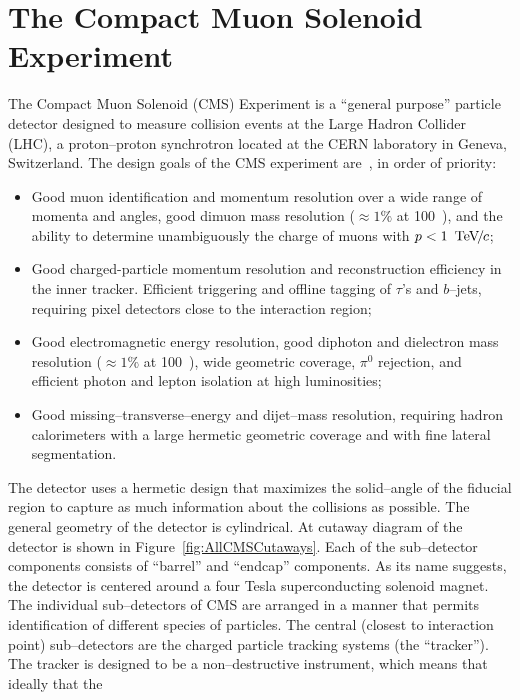\ifx\master\undefined\fi
\chapter{The Compact Muon Solenoid Experiment}
\label{ch:detector}
%
%
The Compact Muon Solenoid (CMS) Experiment is a ``general purpose'' particle
detector designed to measure collision events at the Large Hadron Collider
(LHC), a proton--proton synchrotron located at the CERN laboratory in Geneva,
Switzerland.  The design goals of the CMS experiment are~\cite{CMSExperiment},
in order of priority:
\begin{itemize}
  \item Good muon identification and momentum resolution over a wide range of
    momenta and angles, good dimuon mass resolution ($\approx 1\%$ at 100~\GeVcc),
    and the ability to determine unambiguously the charge of muons with $p <
    1~{\,\text{Te\hspace{-.08em}V\hspace{-0.16em}/\hspace{-0.08em}}c}$;
  \item Good charged-particle momentum resolution and reconstruction efficiency
    in the inner tracker. Efficient triggering and offline tagging of $\tau$'s and
    $b$--jets, requiring pixel detectors close to the interaction region;
  \item Good electromagnetic energy resolution, good diphoton and dielectron
    mass resolution ($\approx 1\%$ at 100~\GeVcc), wide geometric coverage,
    $\pi^0$ rejection, and efficient photon and lepton isolation at high
    luminosities;
  \item Good missing--transverse--energy and dijet--mass resolution, requiring
    hadron calorimeters with a large hermetic geometric coverage and with fine
    lateral segmentation.
\end{itemize}
The detector uses a hermetic design that maximizes the
solid--angle of the fiducial region to capture as much information about the
collisions as possible.  The general geometry of the detector is cylindrical.
At cutaway diagram of the detector is shown in Figure~\ref{fig:AllCMSCutaways}.
Each of the sub--detector components consists of ``barrel'' and ``endcap''
components.  As its name suggests, the detector is centered around a four Tesla
superconducting solenoid magnet.  The individual sub--detectors of CMS are
arranged in a manner that permits identification of different species of
particles.  The central (closest to interaction point) sub--detectors are the
charged particle tracking systems (the ``tracker'').  The tracker is designed to
be a non--destructive instrument, which means that ideally that the
